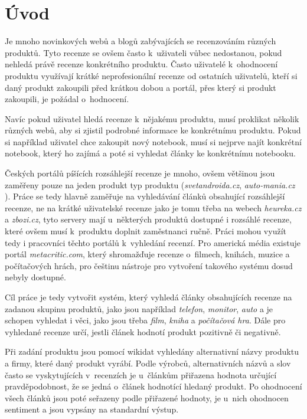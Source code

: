 \chapter{Úvod}

Je mnoho novinkových webů a blogů zabývajících se recenzováním různých produktů. Tyto recenze se ovšem často k~uživateli vůbec nedostanou, pokud nehledá právě recenze konkrétního produktu. Často uživatelé k~ohodnocení produktu využívají krátké neprofesionální recenze od ostatních uživatelů, kteří si daný produkt zakoupili před krátkou dobou a portál, přes který si produkt zakoupili, je požádal o~hodnocení.

Navíc pokud uživatel hledá recenze k~nějakému produktu, musí proklikat několik různých webů, aby si zjistil podrobné informace ke konkrétnímu produktu. Pokud si například uživatel chce zakoupit nový notebook, musí si nejprve najít konkrétní notebook, který ho zajímá a poté si vyhledat články ke konkrétnímu notebooku.

Českých portálů píšících rozsáhlejší recenze je mnoho, ovšem většinou jsou zaměřeny pouze na jeden produkt typ produktu (\textit{svetandroida.cz}, \textit{auto-mania.cz} ). Práce se tedy hlavně zaměřuje na vyhledávání článků obsahující rozsáhlejší recenze, ne na krátké uživatelské recenze jako je tomu třeba na webech \textit{heureka.cz} a \textit{zbozi.cz}, tyto servery mají u~některých produktů dostupné i rozsáhlé recenze, které ovšem musí k~produktu doplnit zaměstnanci ručně. Práci mohou využít tedy i pracovníci těchto portálů k~vyhledání recenzí. Pro americká média existuje portál \textit{metacritic.com}, který shromažďuje recenze o~filmech, knihách, muzice a počítačových hrách, pro češtinu nástroje pro vytvoření takového systému dosud nebyly dostupné. 

Cíl práce je tedy vytvořit systém, který vyhledá články obsahujících recenze na zadanou skupinu produktů, jako jsou například \textit{telefon}, \textit{monitor}, \textit{auto} a je schopen vyhledat i věci, jako jsou třeba \textit{film}, \textit{kniha} a \textit{počítačová hra}. Dále pro vyhledané recenze určí, jestli článek hodnotí produkt pozitivně či negativně.

Při zadání produktu jsou pomocí wikidat vyhledány alternativní názvy produktu a firmy, které daný produkt vyrábí. Podle výrobců, alternativních názvů a slov často se vyskytujících v~recenzích je u~článkům přiřazena hodnota určující pravděpodobnost, že se jedná o~článek hodnotící hledaný produkt. Po ohodnocení všech článků jsou poté seřazeny podle přiřazené hodnoty, je u~nich ohodnocen sentiment a jsou vypsány na standardní výstup.

